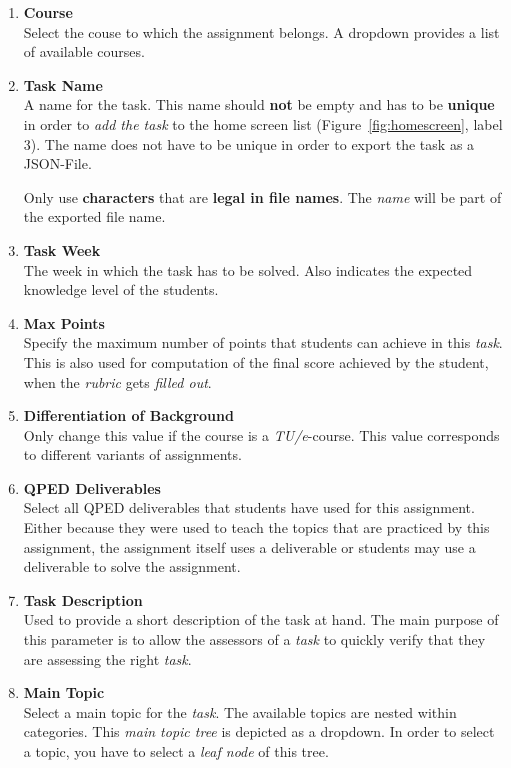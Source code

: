 \begin{enumerate}
  \item \textbf{Course} \\
    Select the couse to which the assignment belongs. A dropdown provides a list of available courses.
  \item \textbf{Task Name} \\
    A name for the task. This name should \textbf{not} be empty and has to be \textbf{unique} in order to \textit{add the task} to the home screen list (Figure~\ref{fig:homescreen}, label 3). The name does not have to be unique in order to export the task as a JSON-File.
    \begin{attention}
      Only use \textbf{characters} that are \textbf{legal in file names}. The \textit{name} will be part of the exported file name.
    \end{attention}
  \item \textbf{Task Week} \\
    The week in which the task has to be solved. Also indicates the expected knowledge level of the students.
  \item \textbf{Max Points} \\
    Specify the maximum number of points that students can achieve in this \textit{task}. This is also used for computation of the final score achieved by the student, when the \textit{rubric} gets \textit{filled out}.
  \item \textbf{Differentiation of Background} \\
    Only change this value if the course is a \textit{TU/e}-course. This value corresponds to different variants of assignments.
  \item \textbf{QPED Deliverables} \\
    Select all QPED deliverables that students have used for this assignment. Either because they were used to teach the topics that are practiced by this assignment, the assignment itself uses a deliverable or students may use a deliverable to solve the assignment. 
  \item \textbf{Task Description} \\
    Used to provide a short description of the task at hand. The main purpose of this parameter is to allow the assessors of a \textit{task} to quickly verify that they are assessing the right \textit{task}.
  \item \textbf{Main Topic} \\
    Select a main topic for the \textit{task}. The available topics are nested within categories. This \textit{main topic tree} is depicted as a dropdown. In order to select a topic, you have to select a \textit{leaf node} of this tree.

\end{enumerate}

